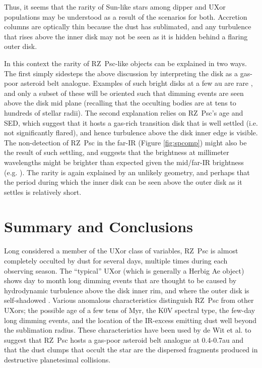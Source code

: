 \documentclass[]{rsos}
\begin{document}
Thus, it seems that the rarity of Sun-like stars among dipper and UXor populations may be
understood as a result of the scenarios for both. Accretion columns are optically thin
because the dust has sublimated, and any turbulence that rises above the inner disk may
not be seen as it is hidden behind a flaring outer disk.

In this context the rarity of RZ~Psc-like objects can be explained in two ways. The first
simply sidesteps the above discussion by interpreting the disk as a gas-poor asteroid
belt analogue. Examples of such bright disks at a few au are rare
\cite{2013MNRAS.433.2334K}, and only a subset of these will be oriented such that dimming
events are seen above the disk mid plane (recalling that the occulting bodies are at tens
to hundreds of stellar radii). The second explanation relies on RZ~Psc's age and SED,
which suggest that it hosts a gas-rich transition disk that is well settled (i.e. not
significantly flared), and hence turbulence above the disk inner edge is visible. The
non-detection of RZ~Psc in the far-IR (Figure \ref{fig:spcomp}) might also be the result
of such settling, and suggests that the brightness at millimeter wavelengths might be
brighter than expected given the mid/far-IR brightness
(e.g. \cite{2004A&A...421.1075D,2007prpl.conf..555D}). The rarity is again explained by
an unlikely geometry, and perhaps that the period during which the inner disk can be seen
above the outer disk as it settles is relatively short.

\section{Summary and Conclusions}\label{s:conc}

Long considered a member of the UXor class of variables, RZ~Psc is almost completely
occulted by dust for several days, multiple times during each observing season. The
``typical'' UXor (which is generally a Herbig Ae object) shows day to month long dimming
events that are thought to be caused by hydrodynamic turbulence above the disk inner rim,
and where the outer disk is self-shadowed \cite{2003ApJ...594L..47D}. Various anomalous
characteristics distinguish RZ~Psc from other UXors; the possible age of a few tens of
Myr, the K0V spectral type, the few-day long dimming events, and the location of the
IR-excess emitting dust well beyond the sublimation radius. These characteristics have
been used by de Wit et al. \cite{2013A&A...553L...1D} to suggest that RZ~Psc hosts a
gas-poor asteroid belt analogue at 0.4-0.7au and that the dust clumps that occult the
star are the dispersed fragments produced in destructive planetesimal collisions.
\end{document}
